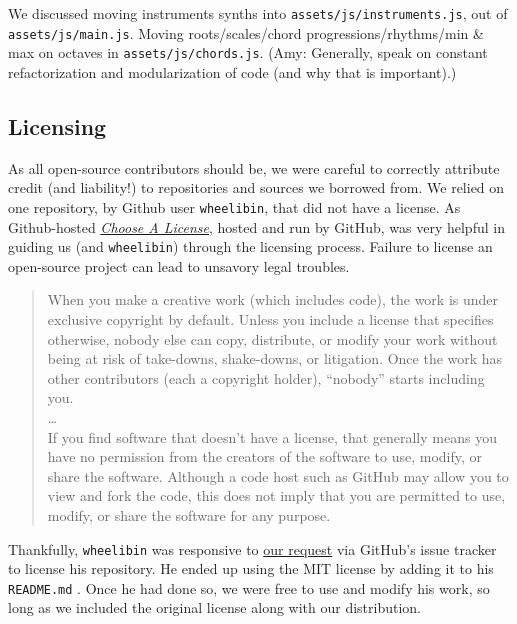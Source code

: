 \documentclass[12pt,a4paper]{article}
\newcommand{\code}{\texttt}
\begin{document}
We discussed moving instruments synths into \code{assets/js/instruments.js}, out of \code{assets/js/main.js}. Moving roots/scales/chord progressions/rhythms/min \& max on octaves in \code{assets/js/chords.js}. (Amy: Generally, speak on constant refactorization and modularization of code (and why that is important).)

\subsection{Licensing}

As all open-source contributors should be, we were careful to correctly attribute credit (and liability!) to repositories and sources we borrowed from. We relied on one repository, by Github user \code{wheelibin}, that did not have a license. As Github-hosted \href{https://choosealicense.com/}{\textit{Choose A License}}, hosted and run by GitHub, was very helpful in guiding us (and \code{wheelibin}) through the licensing process. Failure to license an open-source project can lead to unsavory legal troubles.

\begin{quote}
When you make a creative work (which includes code), the work is under exclusive copyright by default. Unless you include a license that specifies otherwise, nobody else can copy, distribute, or modify your work without being at risk of take-downs, shake-downs, or litigation. Once the work has other contributors (each a copyright holder), “nobody” starts including you. \\
\dots \\
If you find software that doesn’t have a license, that generally means you have no permission from the creators of the software to use, modify, or share the software. Although a code host such as GitHub may allow you to view and fork the code, this does not imply that you are permitted to use, modify, or share the software for any purpose. \cite{choose-license-none}
\end{quote}


Thankfully, \code{wheelibin} was responsive to \href{https://github.com/wheelibin/synaesthesia/issues/2}{our request} via GitHub's issue tracker to license his repository. He ended up using the MIT license by adding it to his \code{README.md} \cite{synaesthesia-license}. Once he had done so, we were free to use and modify his work, so long as we included the original license along with our distribution.
\end{document}
